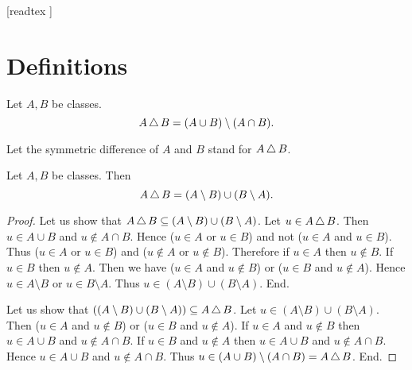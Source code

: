 \documentclass[10pt]{article}
\begin{document}
  \begin{imports}
    \begin{forthel}

      [readtex ]

    \end{forthel}
  \end{imports}


  \section{Definitions}

  \begin{forthel}
    \begin{definition}
      Let $A, B$ be classes.
      \[ A \mathop{\triangle} B = (A \cup B) \setminus (A \cap B). \]
    \end{definition}

    Let the symmetric difference of $A$ and $B$ stand for $A \mathop{\triangle} B$.
  \end{forthel}

  \begin{forthel}
    \begin{proposition}
      Let $A, B$ be classes.
      Then \[ A \mathop{\triangle} B = (A \setminus B) \cup (B \setminus A). \]
    \end{proposition}
    \begin{proof}
      Let us show that $A \mathop{\triangle} B \subseteq
      (A \setminus B) \cup (B \setminus A)$.
        Let $u \in A \mathop{\triangle} B$.
        Then $u \in A \cup B$ and $u \notin A \cap B$.
        Hence ($u \in A$ or $u \in B$) and not ($u \in A$ and $u \in B$).
        Thus ($u \in A$ or $u \in B$) and ($u \notin A$ or $u \notin B$).
        Therefore if $u \in A$ then $u \notin B$.
        If $u \in B$ then $u \notin A$.
        Then we have ($u \in A$ and $u \notin B$) or
        ($u \in B$ and $u \notin A$).
        Hence $u \in A \setminus B$ or $u \in B \setminus A$.
        Thus $u \in (A \setminus B) \cup (B \setminus A)$.
      End.

      Let us show that $((A \setminus B) \cup (B \setminus A)) \subseteq
      A \mathop{\triangle} B$. %
        Let $u \in (A \setminus B) \cup (B \setminus A)$.
        Then ($u \in A$ and $u \notin B$) or ($u \in B$ and $u \notin A$).
        If $u \in A$ and $u \notin B$ then $u \in A \cup B$ and
        $u \notin A \cap B$.
        If $u \in B$ and $u \notin A$ then $u \in A \cup B$ and
        $u \notin A \cap B$.
        Hence $u \in A \cup B$ and $u \notin A \cap B$.
        Thus $u \in (A \cup B) \setminus (A \cap B) = A \mathop{\triangle} B$.
      End.
    \end{proof}
  \end{forthel}
\end{document}
